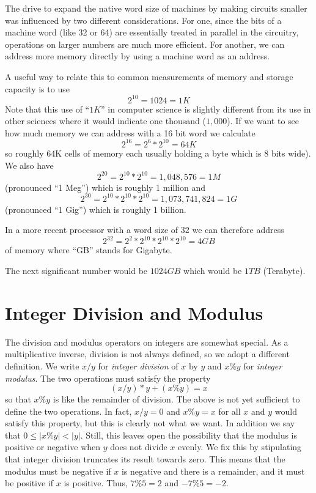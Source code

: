 The drive to expand the native word size of machines by making
circuits smaller was influenced by two different considerations.
For one, since the bits of a machine word (like 32 or 64) are
essentially treated in parallel in the circuitry, operations
on larger numbers are much more efficient.  For another, we
can address more memory directly by using a machine word as
an address.

\begin{gram}
A useful way to relate this to common measurements of memory
and storage capacity is to use
$$
2^{10} = 1024 = 1 K
$$
Note that this use of ``$1 K$'' in computer
science is slightly different from its use in other sciences where it
would indicate one thousand ($1,000$).  If we want to see how much
memory we can address with a 16 bit word we calculate
$$
2^{16} = 2^6 * 2^{10} = 64 K
$$
so roughly 64K cells of memory each usually holding a byte which is 8
bits wide).  We also have
$$
2^{20} = 2^{10} * 2^{10} = 1,048,576 = 1 M
$$
(pronounced ``1 Meg'') which is roughly 1 million and
$$
2^{30} = 2^{10} * 2^{10} * 2^{10} = 1,073,741,824 = 1 G
$$
(pronounced ``1 Gig'') which is roughly 1 billion.

In a more recent processor with a word size of 32 we can therefore
address
$$
2^{32} = 2^2 * 2^{10} * 2^{10} * 2^{10} = 4 GB
$$
of memory where ``GB'' stands for Gigabyte.

The next significant number would be $1024 GB$ which would be
$1 TB$ (Terabyte).
\end{gram}


\section{Integer Division and Modulus}
\label{sec:ints:div}

The division and modulus operators on integers are somewhat special.  As a
multiplicative inverse, division is not always defined, so we adopt a
different definition.  We write $x/y$ for \emph{integer division} of $x$ by
$y$ and $x\%y$ for \emph{integer modulus}.  The two operations must satisfy
the property
$$
(x/y)*y + (x\%y) = x
$$
so that $x\%y$ is like the remainder of division.  The above is not yet
sufficient to define the two operations.  In fact, $x/y = 0$ and $x\%y = x$
for all $x$ and $y$ would satisfy this property, but this is clearly not what
we want.  In addition we say that $0 \leq |x\%y| < |y|$.  Still, this leaves
open the possibility that the modulus is positive or negative when $y$ does
not divide $x$ evenly.  We fix this by stipulating that integer division
truncates its result towards zero.  This means that the modulus must be
negative if $x$ is negative and there is a remainder, and it must be positive
if $x$ is positive.  Thus, $7 \% 5 = 2$ and $-7 \% 5 = -2$.

